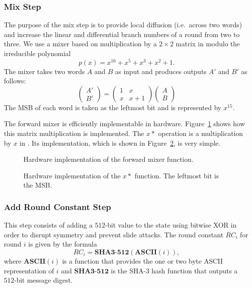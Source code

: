 \subsubsection{Mix Step}
The purpose of the mix step is to provide local diffusion (i.e.\ across two words) and increase the linear and differential branch numbers of a round from two to three.
We use a mixer based on multiplication by a $2 \times 2$ matrix in \gfsixteen modulo the irreducible polynomial
\begin{equation*}
p(x) = x^{16} + x^5 + x^3 + x^2 + 1.
\end{equation*}
The mixer takes two words $A$ and $B$ as input and produces outputs $A'$ and $B'$ as follows:
\begin{equation*}
\begin{pmatrix}
A' \\ B'
\end{pmatrix}
=
\begin{pmatrix}
1 & x \\ x & x + 1
\end{pmatrix}
\begin{pmatrix}
A \\ B
\end{pmatrix}
\end{equation*}
The MSB of each word is taken as the leftmost bit and is represented by $x^{15}$. 

The forward mixer is efficiently implementable in hardware.
Figure~\ref{fig:MixerMatrix} shows how this matrix multiplication is implemented.
The $x*$ operation is a multiplication by $x$ in \gfsixteen.
Its implementation, which is shown in Figure~\ref{fig:xTimes}, is very simple. 

\begin{figure}[ht]
\centering

\caption{Hardware implementation of the forward mixer function.}
\label{fig:MixerMatrix}
\end{figure}

\begin{figure}[ht]
\centering

\caption{Hardware implementation of the $x*$ function. The leftmost bit is the MSB.}
\label{fig:xTimes}
\end{figure}

\subsubsection{Add Round Constant Step}
This step consists of adding a $512$-bit value to the state using bitwise XOR in order to disrupt symmetry and prevent slide attacks.
The round constant $RC_i$ for round $i$ is given by the formula
\begin{equation*}
RC_i = \mathbf{SHA3\textbf{-}512}(\mathbf{ASCII}(i)),
\end{equation*}
where $\mathbf{ASCII}(i)$ is a function that provides the one or two byte ASCII representation of $i$ and $\mathbf{SHA3\textbf{-}512}$ is the SHA-3 hash function that outputs a $512$-bit message digest. 

